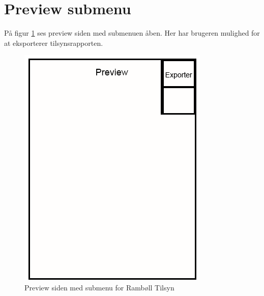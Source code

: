 \section{Preview submenu}\label{sec:PreviewSubMock}
På figur \ref{fig:PreviewSubMock} ses preview siden med submenuen åben. Her har brugeren mulighed for at eksporterer tilsynsrapporten.

\begin{figure}[H]
	\centering
	\includegraphics[width=0.4\linewidth]{MockUps/Mock/Ramboell-Preview-Sub}
	\caption{Preview siden med submenu for Rambøll Tilsyn}
	\label{fig:PreviewSubMock}
\end{figure}

